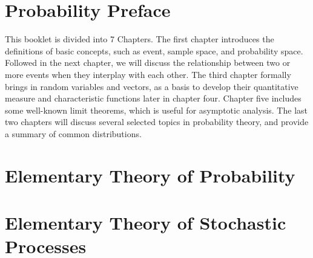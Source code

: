 \section{Probability Preface}
This booklet is divided into 7 Chapters. The first chapter introduces the definitions of basic concepts, such as event, sample space, and probability space. Followed in the next chapter, we will discuss the relationship between two or more events when they interplay with each other. The third chapter formally brings in random variables and vectors, as a basis to develop their quantitative measure and characteristic functions later in chapter four. Chapter five includes some well-known limit theorems, which is useful for asymptotic analysis. The last two chapters will discuss several selected topics in probability theory, and provide a summary of common distributions.

\section{Elementary Theory of Probability}










\section{Elementary Theory of Stochastic Processes}






